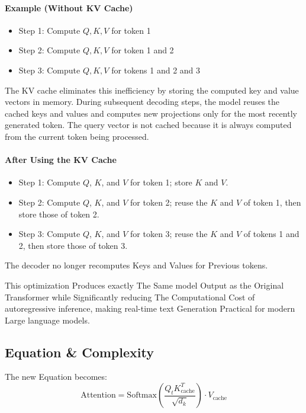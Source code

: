 \paragraph{Example (Without KV Cache)}
\begin{itemize}
    \item Step 1: Compute $Q, K, V$ for token 1
    \item Step 2: Compute $Q, K, V$ for token 1 and 2
    \item Step 3: Compute $Q, K, V$ for tokens 1 and 2 and 3
\end{itemize}

The KV cache eliminates this inefficiency by storing the computed key and value vectors in memory. During subsequent decoding steps, the model reuses the cached keys and values and computes new projections only for the most recently generated token. The query vector is not cached because it is always computed from the current token being processed.

\paragraph{After Using the KV Cache}
\begin{itemize}
    \item Step 1: Compute $Q$, $K$, and $V$ for token 1; store $K$ and $V$.
    \item Step 2: Compute $Q$, $K$, and $V$ for token 2; reuse the $K$ and $V$ of token 1, then store those of token 2.
    \item Step 3: Compute $Q$, $K$, and $V$ for token 3; reuse the $K$ and $V$ of tokens 1 and 2, then store those of token 3.
\end{itemize}

The decoder no longer recomputes Keys and Values for Previous tokens.

This optimization Produces exactly The Same model Output as the Original Transformer while Significantly reducing The Computational Cost of autoregressive inference, making real-time text Generation Practical for modern Large language models.

\subsection{Equation \& Complexity}

The new Equation becomes:
\begin{equation}
\text{Attention} = \text{Softmax}\left(\frac{Q_t K_{\text{cache}}^T}{\sqrt{d_k}}\right) \cdot V_{\text{cache}}
\end{equation}


